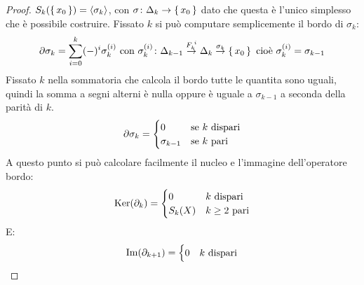\begin{proof}
  $ S_k(\set{x_0}) = \langle\sigma_k\rangle $, con
  $ \sigma \colon \Delta_k \to \set{x_0} $ dato che questa è l'unico simplesso che è possibile
  costruire. Fissato $ k $ si può computare semplicemente il bordo di $ \sigma_k $:
  \[
    \partial \sigma_k = \sum_{i = 0}^k (-)^i \sigma_k^{(i)}  \text{ con }  \sigma_k^{(i)} \colon \Delta_{k-1} \overset{F_k^{\; i}}{\to} \Delta_k \overset{\sigma_k}{\to} \set{x_0}
    \text{ cioè } \sigma_k^{(i)}  = \sigma_{k-1}
  \]
  Fissato $ k $ nella sommatoria che calcola il bordo tutte le quantita sono uguali,
  quindi la somma a segni alterni è nulla oppure è uguale a $ \sigma_{k-1} $ a seconda
  della parità di $ k $.
  \[
    \partial \sigma_k =
    \begin{cases}
      0       & \text{se $ k $ dispari} \\
      \sigma_{k-1} & \text{se $ k $ pari}
    \end{cases}
  \]
  A questo punto si può calcolare facilmente il nucleo e l'immagine dell'operatore
  bordo:
  \[
    \ker{\partial_k} =
    \begin{cases}
      0       & \text{$ k $ dispari} \\
      S_k(X)  & \text{$ k \geq 2$ pari}
    \end{cases}
  \]
  E:
  \[
    \im{\partial_{k+1}} =
    \begin{cases}
      0       & \text{$ k $ dispari} \\

\end{cases}\]
\end{proof}
